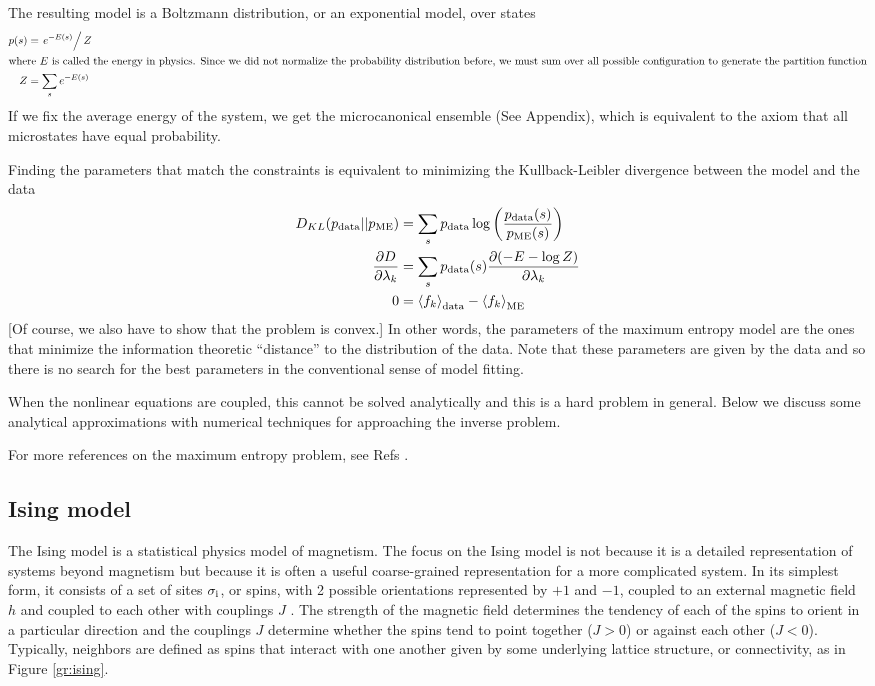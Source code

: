 \documentclass[aps,prl,twocolumn]{revtex4-1}
\begin{document}
The resulting model is a Boltzmann distribution, or an exponential model, over states
\begin{align}
	p(s) &= \left.e^{-E(s)}\right/Z\\
\intertext{where $E$ is called the energy in physics. Since we did not normalize the probability distribution before, we must sum over all possible configuration to generate the partition function}
	Z &= \sum_{s} e^{-E(s)}
\end{align}
If we fix the average energy of the system, we get the microcanonical ensemble (See Appendix), which is equivalent to the axiom that all microstates have equal probability.

Finding the parameters that match the constraints is equivalent to minimizing the Kullback-Leibler divergence between the model and the data \cite{Cover:2006tl}
\begin{align}
	D_{KL}(p_{\rm data}||p_{\rm ME}) &= \sum_s p_{\rm data} \log\left(\frac{p_{\rm data}(s)}{p_{\rm ME}(s)}\right)\\
	\frac{\partial D}{\partial \lambda_k} &= \sum_s p_{\rm data}(s) \frac{\partial (-E-\log Z)}{\partial \lambda_k}\label{eq:dkl deriv}\\
	0 &= \left<f_k\right>_{\rm data} -\left<f_k\right>_{\rm ME}\label{eq:fk-fk}
\end{align}
[Of course, we also have to show that the problem is convex.] In other words, the parameters of the maximum entropy model are the ones that minimize the information theoretic ``distance'' to the distribution of the data. Note that these parameters are given by the data and so there is no search for the best parameters in the conventional sense of model fitting.

When the nonlinear equations are coupled, this cannot be solved analytically and this is a hard problem in general. Below we discuss some analytical approximations with numerical techniques for approaching the inverse problem.

For more references on the maximum entropy problem, see Refs \cite{Jaynes:1957fy,Bialek:2012ueb,Lee:2015ev}.

\subsection{Ising model}
The Ising model is a statistical physics model of magnetism. 
The focus on the Ising model is not because it is a detailed representation of systems beyond magnetism but because it is often a useful coarse-grained representation for a more complicated system.
In its simplest form, it consists of a set of sites $\sigma_{\rm i}$, or spins, with 2 possible orientations represented by $+1$ and $-1$, coupled to an external magnetic field $h$ and coupled to each other with couplings $J$ \cite{Reif:2009uf}. The strength of the magnetic field determines the tendency of each of the spins to orient in a particular direction and the couplings $J$ determine whether the spins tend to point together ($J>0$) or against each other ($J<0$). Typically, neighbors are defined as spins that interact with one another given by some underlying lattice structure, or connectivity, as in Figure \ref{gr:ising}.
\end{document}
